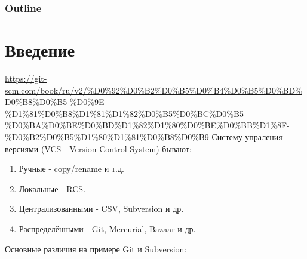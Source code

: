 



\maketitle

\begin{frame}
\frametitle{Outline}
\setcounter{tocdepth}{3}
\tableofcontents
\end{frame}
\section{Введение}
\label{sec-1}

\href{https://git-scm.com/book/ru/v2/%D0%92%D0%B2%D0%B5%D0%B4%D0%B5%D0%BD%D0%B8%D0%B5-%D0%9E-%D1%81%D0%B8%D1%81%D1%82%D0%B5%D0%BC%D0%B5-%D0%BA%D0%BE%D0%BD%D1%82%D1%80%D0%BE%D0%BB%D1%8F-%D0%B2%D0%B5%D1%80%D1%81%D0%B8%D0%B9}{https://git-scm.com/book/ru/v2/\%D0\%92\%D0\%B2\%D0\%B5\%D0\%B4\%D0\%B5\%D0\%BD\%D0\%B8\%D0\%B5-\%D0\%9E-\%D1\%81\%D0\%B8\%D1\%81\%D1\%82\%D0\%B5\%D0\%BC\%D0\%B5-\%D0\%BA\%D0\%BE\%D0\%BD\%D1\%82\%D1\%80\%D0\%BE\%D0\%BB\%D1\%8F-\%D0\%B2\%D0\%B5\%D1\%80\%D1\%81\%D0\%B8\%D0\%B9}
Систему упраления версиями (VCS - Version Control System) бывают:
\begin{enumerate}
\item Ручные - copy/rename и т.д.
\item Локальные - RCS.
\item Централизованными - CSV, Subversion и др.
\item Распределёнными - Git, Mercurial, Bazaar и др.
\end{enumerate}

Основные различия на примере Git и Subversion:

